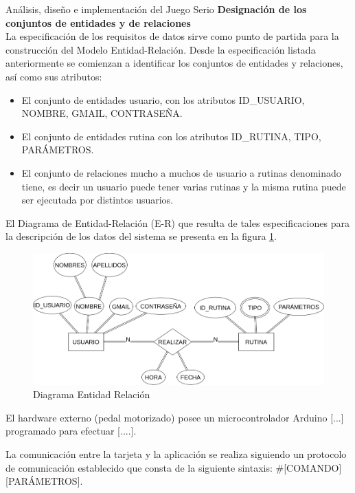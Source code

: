 \begin{thesischapter}{2} {Análisis, diseño e implementación del Juego Serio}
    \vspace{10pt}
    \textbf{Designación de los conjuntos de entidades y de relaciones}\\
    La especificación de los requisitos de datos sirve como punto de partida para la construcción
    del Modelo Entidad-Relación. Desde la especificación listada anteriormente se comienzan a
    identificar los conjuntos de entidades y relaciones, así como sus atributos:
    \begin{itemize}
        \item El conjunto de entidades usuario, con los atributos ID\_USUARIO, NOMBRE, GMAIL, CONTRASEÑA.
        \item El conjunto de entidades rutina con los atributos ID\_RUTINA, TIPO, PARÁMETROS.
        \item El conjunto de relaciones mucho a muchos de usuario a rutinas denominado tiene, es decir un usuario puede tener varias rutinas y la misma rutina puede ser ejecutada por distintos usuarios.
    \end{itemize}
    
    \vspace{10pt}
    El Diagrama de Entidad-Relación (E-R) que resulta de tales especificaciones para la descripción de los datos del sistema se presenta en la figura \ref{fig: diagram-er}.
    \begin{figure}[ht]
        \centering
        \includegraphics[scale=0.4]{images/diagram-er.png}
        \caption{Diagrama Entidad Relación}
        \label{fig: diagram-er}
    \end{figure}

    El hardware externo (pedal motorizado) posee un microcontrolador Arduino [...] programado para efectuar [....]. 
    
    
    La comunicación entre la tarjeta y la aplicación se realiza siguiendo un protocolo de comunicación establecido que 
    consta de la siguiente sintaxis: \#[COMANDO][PARÁMETROS].
    


\end{thesischapter}

